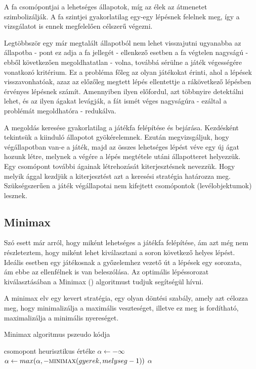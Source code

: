A fa csomópontjai a lehetséges állapotok, míg az élek az átmenetet szimbolizálják. A fa szintjei gyakorlatilag egy-egy lépésnek felelnek meg, így a vizsgálatot is ennek megfelelően célszerű végezni.\ujsor

Legtöbbször egy már megtalált állapotból nem lehet visszajutni ugyanabba az állapotba - pont ez adja a fa jellegét - ellenkező esetben a fa végtelen nagyságú - ebből következően megoldhatatlan - volna, továbbá sérülne a játék végességére vonatkozó kritérium. Ez a probléma főleg az olyan játékokat érinti, ahol a lépések visszavonhatóak, azaz az előzőleg megtett lépés ellentettje a rákövetkező lépésben érvényes lépésnek számít. Amennyiben ilyen előfordul, azt többnyire detektálni lehet, és az ilyen ágakat levágják, a fát ismét véges nagyságúra - ezáltal a problémát megoldhatóra - redukálva.\ujsor

A megoldás keresése gyakorlatilag a játékfa felépítése és bejárása. Kezdésként tekintsük a kiinduló állapotot gyökérelemnek. Ezután  megvizsgáljuk, hogy végállapotban van-e a játék, majd az összes lehetséges lépést véve egy új ágat hozunk létre, melynek a végére a lépés megtétele utáni állapotteret helyezzük. Egy csomópont további ágainak létrehozását kiterjesztésnek nevezzük. Hogy melyik ággal kezdjük a kiterjesztést azt a keresési stratégia határozza meg. Szükségszerűen a játék végállapotai nem kifejtett csomópontok (levélobjektumok) lesznek.\ujsor

\subsection{Minimax}
Szó esett már arról, hogy miként lehetséges a játékfa felépítése, ám azt még nem részleteztem, hogy miként lehet kiválasztani a soron következő helyes lépést. Ideális esetben egy játékosnak a győzelemhez vezető út a lépések egy sorozata, ám ebbe az ellenfélnek is van beleszólása. Az optimális lépéssorozat kiválasztásában a Minimax () algoritmust tudjuk segítségül hívni.\ujsor

A minimax elv egy kevert stratégia, egy olyan döntési szabály, amely azt célozza meg, hogy minimalizálja a maximális veszteséget, illetve ez meg is fordítható, maximalizálja a minimális nyereséget. \ujsor

\begin{algorithm}
	\caption{Minimax algoritmus pszeudo kódja}
	\label{alg:minimax}
\begin{algorithmic}[1]
		\State \Return csomopont heurisztikus értéke
	\Else
		\State $\alpha \gets -\infty$
			\State $\alpha \gets max(\alpha, -\Call{minimax}{gyerek, melyseg - 1})$
			\State \Return $\alpha$
		\EndFor
	\EndIf
	\EndFunction
\end{algorithmic}
\end{algorithm}

